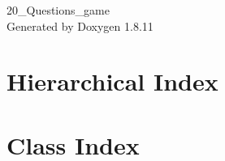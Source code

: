 \documentclass[twoside]{book}
\newcommand{\+}{\discretionary{\mbox{\scriptsize$\hookleftarrow$}}{}{}}
\newcommand{\clearemptydoublepage}{%
  \newpage{\pagestyle{empty}\cleardoublepage}%
}
\begin{document}
\hypersetup{pageanchor=false,
             bookmarksnumbered=true,
             pdfencoding=unicode
            }
\begin{titlepage}
\vspace*{7cm}
\begin{center}%
{\Large 20\+\_\+\+Questions\+\_\+game }\\
\vspace*{1cm}
{\large Generated by Doxygen 1.8.11}\\
\end{center}
\end{titlepage}
\clearemptydoublepage
\tableofcontents
\clearemptydoublepage
{}
\hypersetup{pageanchor=true}

\chapter{Hierarchical Index}

\chapter{Class Index}

\end{document}
